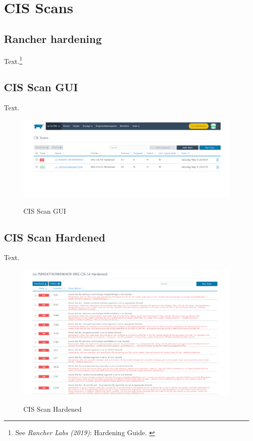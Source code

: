 %
%

\pagebreak
\section{CIS Scans}

\onehalfspacing

\subsection{Rancher hardening}

Text.\footnote{See \textit{Rancher Labs (2019)}: Hardening Guide. \cite{hardeningGuide}}

\subsection{CIS Scan GUI}

Text. 

\begin{figure}[H]
\centering
\caption {CIS Scan GUI}
\includegraphics[width=\linewidth]{images/cis-scan-overview.png}
\label{fig:cisScanOverview}
\end{figure}

\subsection{CIS Scan Hardened}

Text. 

\begin{figure}[H]
\centering
\caption {CIS Scan Hardened}
\includegraphics[width=\linewidth]{images/cis-scan-detail.png}
\label{fig:cisScanDetails}
\end{figure}

